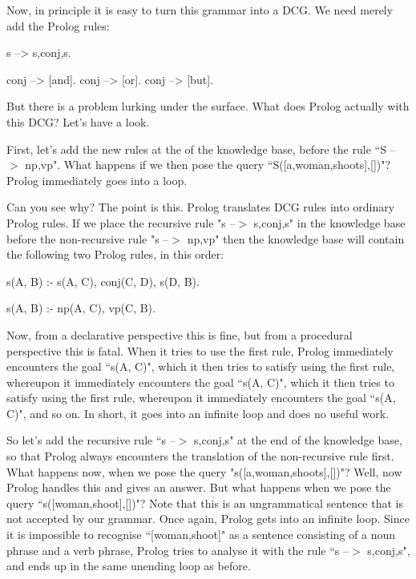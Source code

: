 Now, in principle it is easy to turn this grammar into a DCG. We
need merely add the Prolog rules:

\begin{LPNcodedisplay}
s --> s,conj,s.

conj --> [and].
conj --> [or].
conj --> [but].
\end{LPNcodedisplay}
But there is a problem lurking under the surface. What does Prolog
actually  with this DCG? Let's have a look.

First, let's add the new rules at the  of the
knowledge base, before the rule ``S --$>$ np,vp". What happens if we then
pose the query ``S([a,woman,shoots],[])"? Prolog immediately goes into
a loop.

Can you see why? The point is this. Prolog translates DCG rules into
ordinary Prolog rules. If we place the recursive rule
"s --$>$ s,conj,s" in the knowledge base before the non-recursive
rule
"s --$>$ np,vp" then the knowledge base will contain the following two
Prolog rules, in this order:
\begin{LPNcodedisplay}
s(A, B) :-
        s(A, C),
        conj(C, D),
        s(D, B).

s(A, B) :-
        np(A, C),
        vp(C, B).
\end{LPNcodedisplay}

Now, from a declarative perspective this is fine, but from a
procedural perspective this is fatal.  When it tries to use the first
rule, Prolog immediately encounters the goal ``s(A, C)", which it then
tries to satisfy using the first rule, whereupon it immediately
encounters the goal ``s(A, C)", which it then tries to satisfy using
the first rule, whereupon it immediately encounters the goal ``s(A, C)",
and so on. In short, it goes into an infinite loop and does no
useful work.

So let's add the recursive rule ``s --$>$ s,conj,s" at the end of the
knowledge base, so that Prolog always encounters the translation of
the non-recursive rule first. What happens now, when we pose the query
"s([a,woman,shoots],[])"? Well, now Prolog handles this and gives an
answer. But what happens when we pose the query ``s([woman,shoot],[])"?
Note that this is an ungrammatical sentence that is not accepted by
our grammar. Once again, Prolog gets into an infinite loop. Since it
is impossible to recognise ``[woman,shoot]" as a sentence consisting of
a noun phrase and a verb phrase, Prolog tries to analyse it with the
rule ``s --$>$ s,conj,s", and ends up in the same unending loop as
before.

